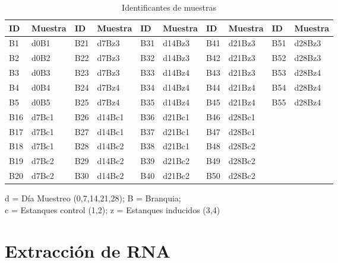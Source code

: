 \documentclass[12pt,a4paper,oneside]{scrbook}
\begin{document}
\begin{table}[h!]
\sffamily
\begin{center}
    \begin{threeparttable}
      \caption{Identificantes de muestras}\label{tablaidentificantes}
      \begin{tabular}{l l l l l l l l l l}
    \toprule
    \textbf{ID} & \textbf{Muestra} & \textbf{ID} & \textbf{Muestra} & \textbf{ID} & \textbf{Muestra} & \textbf{ID} & \textbf{Muestra} & \textbf{ID} & \textbf{Muestra}\\
    \midrule
    B1 & d0B1 & B21 & d7Bz3 & B31 & d14Bz3 & B41 & d21Bz3 & B51 & d28Bz3 \\
    B2 & d0B2 & B22 & d7Bz3 & B32 & d14Bz3 & B42 & d21Bz3 & B52 & d28Bz3 \\
    B3 & d0B3 & B23 & d7Bz3 & B33 & d14Bz4 & B43 & d21Bz3 & B53 & d28Bz4 \\
    B4 & d0B4 & B24 & d7Bz4 & B34 & d14Bz4 & B44 & d21Bz4 & B54 & d28Bz4 \\
    B5 & d0B5 & B25 & d7Bz4 & B35 & d14Bz4 & B45 & d21Bz4 & B55 & d28Bz4 \\
    B16 & d7Bc1 & B26 & d14Bc1 & B36 & d21Bc1 & B46 & d28Bc1 & \\
    B17 & d7Bc1 & B27 & d14Bc1 & B37 & d21Bc1 & B47 & d28Bc1 & \\
    B18 & d7Bc1 & B28 & d14Bc2 & B38 & d21Bc1 & B48 & d28Bc2 & \\
    B19 & d7Bc2 & B29 & d14Bc2 & B39 & d21Bc2 & B49 & d28Bc2 & \\
    B20 & d7Bc2 & B30 & d14Bc2 & B40 & d21Bc2 & B50 & d28Bc2 & \\
\bottomrule
\end{tabular}
\begin{tablenotes}
  \item d = Día Muestreo (0,7,14,21,28); B = Branquia; \\
  c = Estanques control (1,2); z = Estanques inducidos (3,4)
\end{tablenotes}
\end{threeparttable}
\end{center}
\end{table}

\clearpage

\section{Extracción de RNA}\label{extraccionrna}
\end{document}
